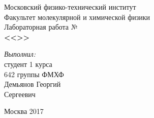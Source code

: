 \begin{titlepage}
\begin{center} 
 
\large Московский физико-технический институт\\
Факультет молекулярной и химической физики\\
\vspace{7cm}
\huge Лабораторная работа №\\
\textbf{\Large <<>>}\\
\end{center} 

\vspace{7.5cm}
{\par \raggedleft \large \emph{Выполнил:}\\ студент 1 курса\\ 642 группы ФМХФ\\ Демьянов Георгий\\ Сергеевич \par}
\begin{center}
\vfill Москва 2017
\end{center}
\end{titlepage}
\newpage
